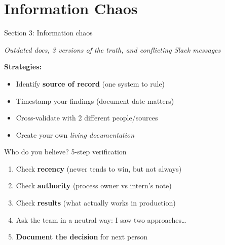 \documentclass[aspectratio=169, 11pt]{beamer}
\begin{document}
	\section{Information Chaos}
	\begin{frame}{Section 3: Information chaos}
		\begin{center}
			\textit{\Large Outdated docs, 3 versions of the truth, and conflicting Slack messages}
		\end{center}
		\vspace{0.4cm}
		\textbf{Strategies:}
		\begin{itemize}
			\item Identify \textbf{source of record} (one system to rule)
			\item Timestamp your findings (document date matters)
			\item Cross-validate with 2 different people/sources
			\item Create your own \textit{living documentation}
		\end{itemize}
	\end{frame}
	
	\begin{frame}{Who do you believe? 5-step verification}
		\begin{enumerate}
			\item Check \textbf{recency} (newer tends to win, but not always)
			\item Check \textbf{authority} (process owner vs intern's note)
			\item Check \textbf{results} (what actually works in production)
			\item Ask the team in a neutral way:  I saw two approaches… 
			\item \textbf{Document the decision} for next person
		\end{enumerate}
	\end{frame}
	
\end{document}
